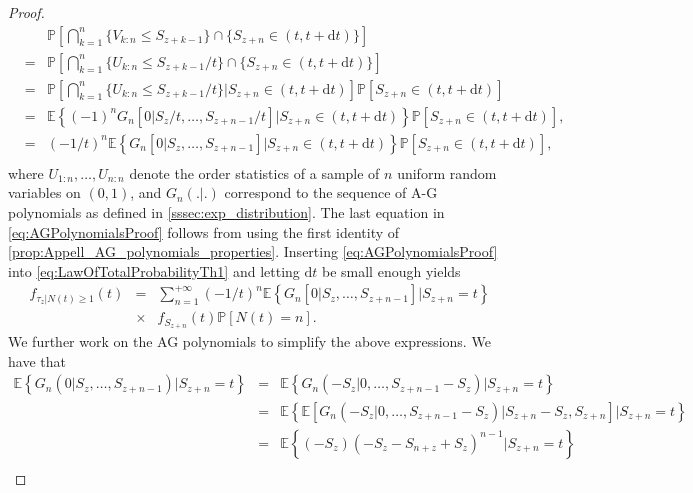 \begin{proof}
\begin{eqnarray}
&&\mathbb{P}\left[\bigcap_{k=1}^{n}\{V_{k:n}\leq S_{z+k-1}\}\cap\{S_{z+n}\in(t,t+\text{d}t)\}\right]\nonumber\\
&=&\mathbb{P}\left[\bigcap_{k=1}^{n}\{U_{k:n}\leq S_{z+k-1}/ t\}\cap\{S_{z+n}\in(t,t+\text{d}t)\}\right]\nonumber\\
&=&\mathbb{P}\left[\bigcap_{k=1}^{n}\{U_{k:n}\leq S_{z+k-1}/t\}\big\rvert S_{z+n}\in(t,t+\text{d}t)\right]\mathbb{P}[S_{z+n}\in(t,t+\text{d}t)]\nonumber\\
&=&\mathbb{E}\left\{(-1)^{n}G_{n}[0\big\rvert S_{z}/t,\ldots, S_{z+n-1} / t] \big\rvert S_{z+n}\in(t,t+\text{d}t)\right\}\mathbb{P}[S_{z+n}\in(t,t+\text{d}t)],\nonumber\\
&=&(-1/t)^{n}\mathbb{E}\left\{G_{n}[0\big\rvert S_{z},\ldots, S_{z+n-1}] \big\rvert S_{z+n}\in(t,t+\text{d}t)\right\}\mathbb{P}[S_{z+n}\in(t,t+\text{d}t)],\nonumber\\
&&\label{eq:AGPolynomialsProof}
\end{eqnarray}
where $U_{1:n},\ldots,U_{n:n}$ denote the order statistics of a sample of $n$ \iid uniform random variables on $(0,1)$, and $G_n(.|.)$ correspond to the sequence of A-G polynomials as defined in \cref{sssec:exp_distribution}. The last equation in \eqref{eq:AGPolynomialsProof} follows from using the first identity of \cref{prop:Appell_AG_polynomials_properties}.
Inserting \eqref{eq:AGPolynomialsProof} into \eqref{eq:LawOfTotalProbabilityTh1} and letting $\text{d}t$ be small enough yields
\begin{eqnarray}
f_{\tau_z|N(t)\geq1}(t)&=&\sum_{n=1}^{+\infty}(-1/t)^{n}\mathbb{E}\left\{G_{n}[0\big\rvert S_{z},\ldots,S_{z+n-1}] \big\rvert S_{z+n}=t\right\}\nonumber\\
&\times&f_{S_{z+n}}(t)\mathbb{P}[N(t)=n]\label{eq:cond_pdf_tau_N_greater_than_1}.
\end{eqnarray}
We further work on the AG polynomials to simplify the above expressions. We have that
\begin{eqnarray} 
\mathbb{E}\left\{G_{n}(0\big\rvert S_{z},\ldots,S_{z+n-1}) \rvert S_{z+n}=t\right\}&=& \mathbb{E}\left\{G_{n}(-S_z\rvert 0,\ldots,S_{z+n-1}-S_z) \rvert S_{z+n}=t\right\} \nonumber\\
&=& \mathbb{E}\left\{\mathbb{E}\left[G_{n}(-S_z\rvert 0,\ldots,S_{z+n-1}-S_z)\rvert S_{z+n}-S_z, S_{z+n}\right] \rvert S_{z+n}=t\right\} \nonumber\\
&=& \mathbb{E}\left\{(-S_z)(-S_z-S_{n+z}+S_z)^{n-1} \rvert S_{z+n}=t\right\} \nonumber\\

\end{eqnarray}
\end{proof}
